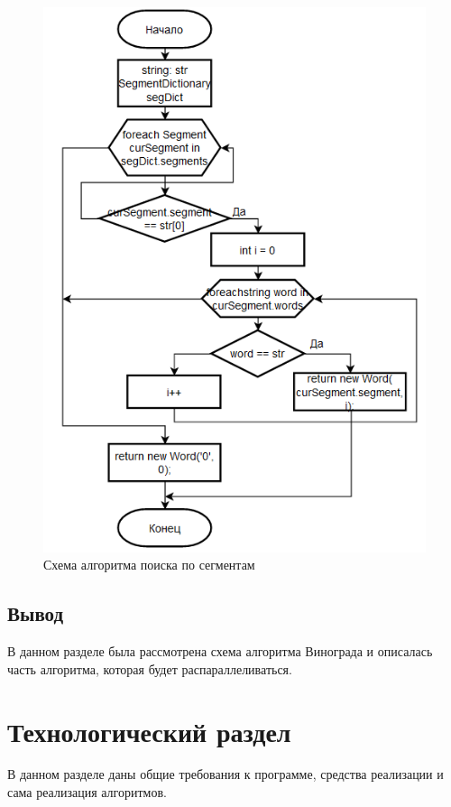 \documentclass[14pt, a4paper]{extarticle}
\begin{document}
\begin{figure}[h!]
	\centering
	\includegraphics[scale=1]{source/alg3.png}
	\caption{Схема алгоритма поиска по сегментам}
	\label{Schema3}
\end{figure}	
\subsection{Вывод}
В данном разделе была рассмотрена схема алгоритма Винограда и описалась часть алгоритма, которая будет распараллеливаться.

\clearpage
\section{Технологический раздел}
В данном разделе даны общие требования к программе, средства реализации и сама реализация алгоритмов.
\end{document}
